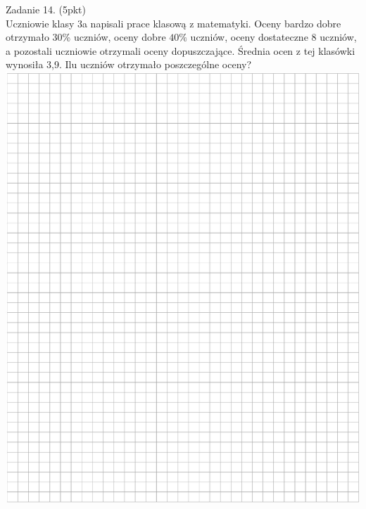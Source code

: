 \documentclass[10pt]{article}
\begin{document}
Zadanie 14. (5pkt)\\
Uczniowie klasy 3a napisali prace klasową z matematyki. Oceny bardzo dobre otrzymało 30\% uczniów, oceny dobre \(40 \%\) uczniów, oceny dostateczne 8 uczniów, a pozostali uczniowie otrzymali oceny dopuszczające. Średnia ocen z tej klasówki wynosiła 3,9. Ilu uczniów otrzymało poszczególne oceny?\\
\includegraphics[max width=\textwidth, center]{2024_11_21_439e1d90cd1e7f928ae2g-12}
\end{document}
